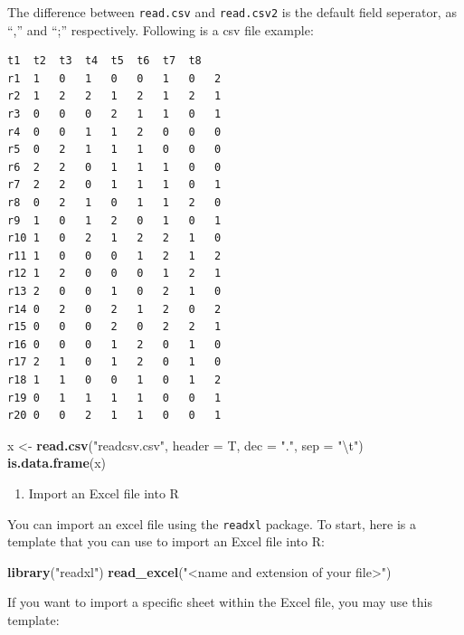 \documentclass[]{book}
\newenvironment{Shaded}{\begin{snugshade}}{\end{snugshade}}
\newcommand{\KeywordTok}[1]{\textcolor[rgb]{0.13,0.29,0.53}{\textbf{#1}}}
\newcommand{\DataTypeTok}[1]{\textcolor[rgb]{0.13,0.29,0.53}{#1}}
\newcommand{\CharTok}[1]{\textcolor[rgb]{0.31,0.60,0.02}{#1}}
\newcommand{\StringTok}[1]{\textcolor[rgb]{0.31,0.60,0.02}{#1}}
\newcommand{\NormalTok}[1]{#1}
\providecommand{\tightlist}{%
  \setlength{\itemsep}{0pt}\setlength{\parskip}{0pt}}
\begin{document}
The difference between \texttt{read.csv} and \texttt{read.csv2} is the
default field seperator, as ``,'' and ``;'' respectively. Following is a
csv file example:

\begin{verbatim}
t1  t2  t3  t4  t5  t6  t7  t8
r1  1   0   1   0   0   1   0   2
r2  1   2   2   1   2   1   2   1
r3  0   0   0   2   1   1   0   1
r4  0   0   1   1   2   0   0   0
r5  0   2   1   1   1   0   0   0
r6  2   2   0   1   1   1   0   0
r7  2   2   0   1   1   1   0   1
r8  0   2   1   0   1   1   2   0
r9  1   0   1   2   0   1   0   1
r10 1   0   2   1   2   2   1   0
r11 1   0   0   0   1   2   1   2
r12 1   2   0   0   0   1   2   1
r13 2   0   0   1   0   2   1   0
r14 0   2   0   2   1   2   0   2
r15 0   0   0   2   0   2   2   1
r16 0   0   0   1   2   0   1   0
r17 2   1   0   1   2   0   1   0
r18 1   1   0   0   1   0   1   2
r19 0   1   1   1   1   0   0   1
r20 0   0   2   1   1   0   0   1
\end{verbatim}

\begin{Shaded}
\begin{Highlighting}[]
\NormalTok{x <-}\StringTok{ }\KeywordTok{read.csv}\NormalTok{(}\StringTok{"readcsv.csv"}\NormalTok{, }\DataTypeTok{header =}\NormalTok{ T, }\DataTypeTok{dec =} \StringTok{"."}\NormalTok{, }\DataTypeTok{sep =} \StringTok{"}\CharTok{\textbackslash{}t}\StringTok{"}\NormalTok{) }
\KeywordTok{is.data.frame}\NormalTok{(x) }
\end{Highlighting}
\end{Shaded}

\begin{enumerate}
\def\labelenumi{\arabic{enumi}.}
\setcounter{enumi}{3}
\tightlist
\item
  Import an Excel file into R
\end{enumerate}

You can import an excel file using the \texttt{readxl} package. To
start, here is a template that you can use to import an Excel file into
R:

\begin{Shaded}
\begin{Highlighting}[]
\KeywordTok{library}\NormalTok{(}\StringTok{"readxl"}\NormalTok{)}
\KeywordTok{read_excel}\NormalTok{(}\StringTok{"<name and extension of your file>"}\NormalTok{)}
\end{Highlighting}
\end{Shaded}

If you want to import a specific sheet within the Excel file, you may
use this template:
\end{document}
